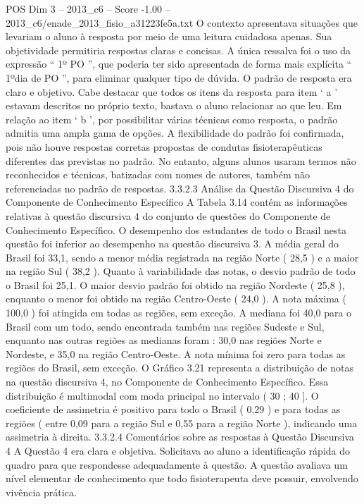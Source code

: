 \begin{textsample}{POS Dim 3 – 2013\_c6 – Score -1.00 – 2013\_c6/enade\_2013\_fisio\_a31223fe5a.txt}
O contexto apresentava situações que levariam o aluno à resposta por meio de uma leitura cuidadosa apenas.
Sua objetividade permitiria respostas claras e concisas.
A única ressalva foi o uso da expressão “ 1º PO ”, que poderia ter sido apresentada de forma mais explícita “ 1ºdia de PO ”, para eliminar qualquer tipo de dúvida.
O padrão de resposta era claro e objetivo.
Cabe destacar que todos os itens da resposta para item ‘ a ’ estavam descritos no próprio texto, bastava o aluno relacionar ao que leu.
Em relação ao item ‘ b ’, por possibilitar várias técnicas como resposta, o padrão admitia uma ampla gama de opções.
A flexibilidade do padrão foi confirmada, pois não houve respostas corretas propostas de condutas fisioterapêuticas diferentes das previstas no padrão.
No entanto, alguns alunos usaram termos não reconhecidos e técnicas, batizadas com nomes de autores, também não referenciadas no padrão de respostas. 3.3.2.3 Análise da Questão Discursiva 4 do Componente de Conhecimento Específico A Tabela 3.14 contém as informações relativas à questão discursiva 4 do conjunto de questões do Componente de Conhecimento Específico.
O desempenho dos estudantes de todo o Brasil nesta questão foi inferior ao desempenho na questão discursiva 3.
A média geral do Brasil foi 33,1, sendo a menor média registrada na região Norte ( 28,5 ) e a maior na região Sul ( 38,2 ).
Quanto à variabilidade das notas, o desvio padrão de todo o Brasil foi 25,1.
O maior desvio padrão foi obtido na região Nordeste ( 25,8 ), enquanto o menor foi obtido na região Centro-Oeste ( 24,0 ).
A nota máxima ( 100,0 ) foi atingida em todas as regiões, sem exceção.
A mediana foi 40,0 para o Brasil com um todo, sendo encontrada também nas regiões Sudeste e Sul, enquanto nas outras regiões as medianas foram : 30,0 nas regiões Norte e Nordeste, e 35,0 na região Centro-Oeste.
A nota mínima foi zero para todas as regiões do Brasil, sem exceção.
O Gráfico 3.21 representa a distribuição de notas na questão discursiva 4, no Componente de Conhecimento Específico.
Essa distribuição é multimodal com moda principal no intervalo ( 30 ; 40 ].
O coeficiente de assimetria é positivo para todo o Brasil ( 0,29 ) e para todas as regiões ( entre 0,09 para a região Sul e 0,55 para a região Norte ), indicando uma assimetria à direita. 3.3.2.4 Comentários sobre as respostas à Questão Discursiva 4 A Questão 4 era clara e objetiva.
Solicitava ao aluno a identificação rápida do quadro para que respondesse adequadamente à questão.
A questão avaliava um nível elementar de conhecimento que todo fisioterapeuta deve possuir, envolvendo vivência prática.

\end{textsample}
